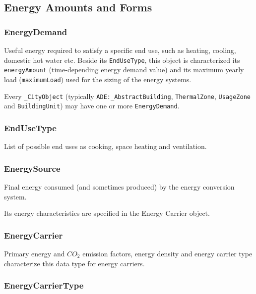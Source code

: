 \documentclass[a4paper,12pt]{article}
\begin{document}
\subsection{Energy Amounts and Forms}\label{energy-amounts-and-forms}

\subsubsection{EnergyDemand}\label{energydemand}

Useful energy required to satisfy a specific end use, such as heating,
cooling, domestic hot water etc. Beside its \texttt{EndUseType}, this
object is characterized its \texttt{energyAmount} (time-depending energy
demand value) and its maximum yearly load (\texttt{maximumLoad}) used
for the sizing of the energy systems.

Every \texttt{\_CityObject} (typically \texttt{ADE:\_AbstractBuilding},
\texttt{ThermalZone}, \texttt{UsageZone} and \texttt{BuildingUnit}) may
have one or more \texttt{EnergyDemand}.

\subsubsection{EndUseType}\label{endusetype}

List of possible end uses as cooking, space heating and ventilation.

\subsubsection{EnergySource}\label{energysource}

Final energy consumed (and sometimes produced) by the energy conversion
system.

Its energy characteristics are specified in the Energy Carrier object.

\subsubsection{EnergyCarrier}\label{energycarrier}

Primary energy and \(CO_2\) emission factors, energy density and energy
carrier type characterize this data type for energy carriers.

\subsubsection{EnergyCarrierType}\label{energycarriertype}
\end{document}
